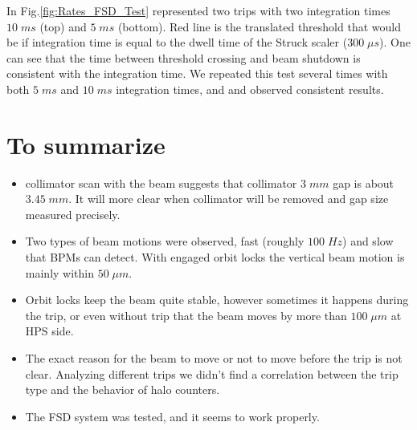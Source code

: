 \documentclass[letterpaper,12pt]{article}
\begin{document}
 In Fig.\ref{fig:Rates_FSD_Test} represented two trips with two integration times $10\; ms$ (top) and
 $5\;ms$ (bottom). Red line is the translated threshold that would be if integration time is
 equal to the dwell time of the Struck scaler ($300\;\mu s$). One can see that the time
 between threshold crossing and beam shutdown is consistent with the integration time.
 We repeated this test several times with both $5\;ms$ and $10\;ms$ integration times, and 
 and observed consistent results. 
 
  \section{To summarize}
  \begin{itemize}
  
 \item collimator scan with the beam suggests that collimator $3\;mm$ gap is about $3.45\;mm$. It will
 more clear when collimator will be removed and gap size measured precisely.

 \item Two types of beam motions were observed, fast (roughly $100\; Hz$) and slow that BPMs can detect.
  With engaged orbit locks the vertical beam motion is mainly within $50\;\mu m$.
  
 \item Orbit locks keep the beam quite stable, however sometimes it happens during the trip, 
  or even without trip that the beam moves by more than $100\;\mu m$ at HPS side.

 \item The exact reason for the beam to move or not to move before the trip is not clear.
 Analyzing different trips we didn't find a correlation between the trip type and 
 the behavior of halo counters.

 \item The FSD system was tested, and it seems to work properly.

 \end{itemize}
 
\end{document}
